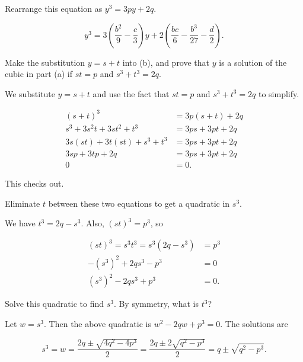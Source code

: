 \documentclass[../key.tex]{subfiles}
\begin{document}
\begin{inner_problem}
\item Rearrange this equation as $y^3=3py+2q$.
\end{inner_problem}

$$y^3 = 3\left(\frac{b^2}{9} - \frac{c}{3}\right)y + 2 \left(\frac{bc}{6} - \frac{b^3}{27} - \frac{d}{2}\right).$$

\begin{inner_problem}
\item Make the substitution $y=s+t$ into (b), and prove that $y$ is a solution of the cubic in part (a) if $st=p$ and $s^3+t^3=2q$.
\end{inner_problem}

We substitute $y=s+t$ and use the fact that $st=p$ and $s^3+t^3=2q$ to simplify.

\begin{align*}
(s+t)^3 &= 3p(s+t) + 2q \\
s^3 + 3s^2t + 3st^2 + t^3 &= 3ps + 3pt + 2q \\
3s(st) + 3t(st) + s^3 + t^3 &= 3ps + 3pt + 2q \\
3sp + 3tp + 2q &= 3ps + 3pt + 2q \\
0 &= 0.
\end{align*}

This checks out.

\begin{inner_problem}
\item Eliminate $t$ between these two equations to get a quadratic in $s^3$.
\end{inner_problem}

We have $t^3=2q-s^3$. Also, $(st)^3=p^3$, so

\begin{align*}
(st)^3=s^3t^3=s^3(2q-s^3) &= p^3 \\
-(s^3)^2 + 2qs^3 - p^3 &= 0 \\
(s^3)^2 - 2qs^3 + p^3 &= 0.
\end{align*}

\begin{inner_problem}
\item Solve this quadratic to find $s^3$. By symmetry, what is $t^3$?
\end{inner_problem}

Let $w=s^3$. Then the above quadratic is $w^2 - 2qw + p^3 = 0$. The solutions are

$$s^3 = w = \frac{2q \pm \sqrt{4q^2 - 4p^3}}{2}=\frac{2q\pm 2\sqrt{q^2 - p^3}}{2} = q\pm \sqrt{q^2 - p^3}.$$
\end{document}

